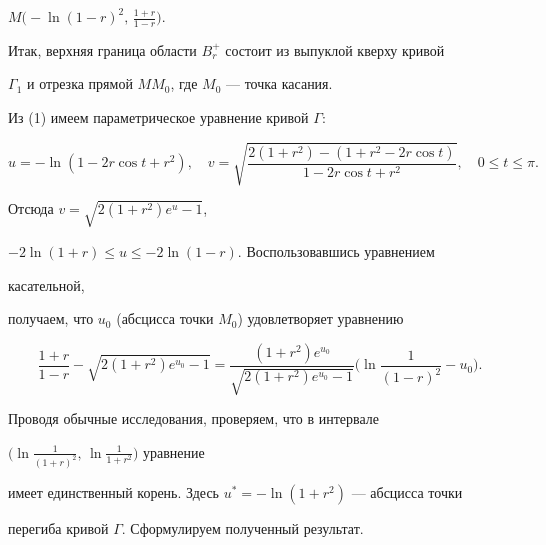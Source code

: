 $M\Big(-\ln(1-r)^2,\,\frac{1+r}{1-r}\Big)$. 


Итак, верхняя граница области $B^+_r$ состоит из выпуклой кверху кривой 


$\Gamma_1$ и отрезка прямой $MM_0$, где $M_0$ --- точка касания. 


 


Из (1) имеем параметрическое уравнение кривой $\Gamma$: 


$$ 


u=-\ln(1-2r\cos t+r^2),\quad 


v=\sqrt{\frac{2(1+r^2)-(1+r^2-2r\cos t)} 


{1-2r\cos t+r^2}},\quad 0\le t\le\pi. 


$$ 


Отсюда $v=\sqrt{2(1+r^2)e^u-1}$, 


$-2\ln(1+r)\le u\le-2\ln(1-r)$. Воспользовавшись уравнением 


касательной, 


получаем, что $u_0$ (абсцисса точки $M_0$) удовлетворяет уравнению 


\begin{equation} 


\frac{1+r}{1-r}-\sqrt{2(1+r^2)e^{u_0}-1}= 


\frac{(1+r^2)e^{u_0}}{\sqrt{2(1+r^2)e^{u_0}-1}} 


\bigg(\ln\frac{1}{(1-r)^2}-u_0\bigg). 


\end{equation} 


Проводя обычные исследования, проверяем, что в интервале 


$\Big(\ln\frac{1}{(1+r)^2},\,\ln\frac{1}{1+r^2}\Big)$ уравнение 


имеет единственный корень. Здесь $u^*=-\ln(1+r^2)$ --- абсцисса точки 


перегиба кривой $\Gamma$. Сформулируем полученный результат. 


 


